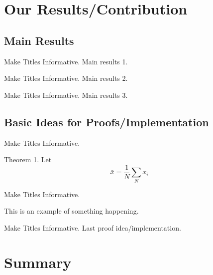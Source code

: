 \documentclass[xcolor=x11names, compress]{beamer}
\renewcommand{\(}{\begin{columns}}
\renewcommand{\)}{\end{columns}}
\newcommand{\<}[1]{\begin{column}{#1}}
\renewcommand{\>}{\end{column}}
\begin{document}
\section{Our Results/Contribution}

\subsection{Main Results}

\begin{frame}{Make Titles Informative.}
Main results 1.
\end{frame}

\begin{frame}{Make Titles Informative.}
Main results 2.
\end{frame}

\begin{frame}{Make Titles Informative.}
Main results 3.
\end{frame}


\subsection{Basic Ideas for Proofs/Implementation}

\begin{frame}{Make Titles Informative.}
\begin{theorem}
Theorem 1. Let $$\bar{x} = \frac{1}{N} \sum_{N} x_i$$
\end{theorem}
\end{frame}

\begin{frame}{Make Titles Informative.}
\begin{example}
This is an example of something happening.
\end{example}
\end{frame}

\begin{frame}{Make Titles Informative.}
Last proof idea/implementation.
\end{frame}



\section*{Summary}
\end{document}
